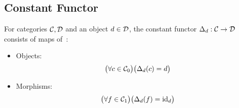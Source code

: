 \subsection{Constant Functor}
\begin{definition}
  For categories $\mathcal{C},\mathcal{D}$ and an object $d\in \mathcal{D}$, the constant functor
  $\Delta_d: \mathcal{C}\to \mathcal{D}$ consists of maps of~\parencite{awodey:category_theory}:
  \begin{itemize}
    \item Objects:
      \[\big(\forall c\in \mathcal{C}_0\big)
        \big(\Delta_d(c) = d\big)\]
    \item Morphisms:
      \[\big(\forall f\in \mathcal{C}_1\big)
        \big(\Delta_d(f) = \mathrm{id}_d\big)\]
  \end{itemize}
\end{definition}
